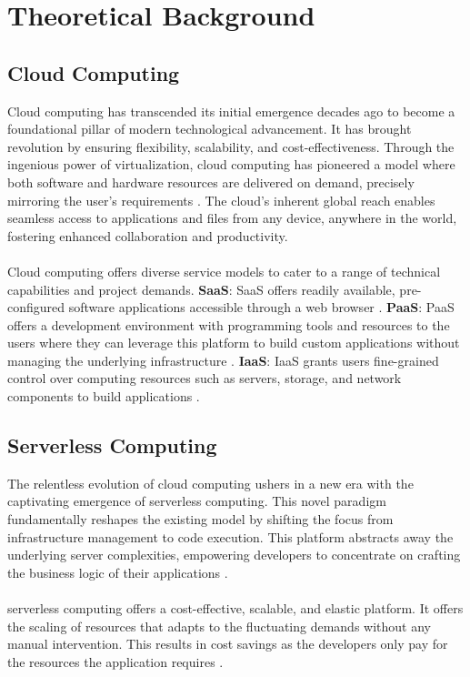 %
\section{Theoretical Background}\label{sec:theoretical background}
%
\subsection {Cloud Computing}
Cloud computing has transcended its initial emergence decades ago to become a foundational pillar of modern technological advancement. It has brought revolution by ensuring flexibility, scalability, and cost-effectiveness. Through the ingenious power of virtualization, cloud computing has pioneered a model where both software and hardware resources are delivered on demand, precisely mirroring the user's requirements \cite{Chou15}. The cloud's inherent global reach enables seamless access to applications and files from any device, anywhere in the world, fostering enhanced collaboration and productivity\cite{NIST}.\\\\
Cloud computing offers diverse service models to cater to a range of technical capabilities and project demands. 
\textbf {\ac{SaaS}}: SaaS offers readily available, pre-configured software applications accessible through a web browser \cite{Odu18,HBS21}. 
\textbf {\ac{PaaS}}: PaaS offers a development environment with programming tools and resources to the users where they can leverage this platform to build custom applications without managing the underlying infrastructure \cite{Odu18,HBS21}. 
\textbf {\ac{IaaS}}: IaaS grants users fine-grained control over computing resources such as servers, storage, and network components to build applications \cite{Odu18,HBS21}. \\

\subsection {Serverless Computing}

The relentless evolution of cloud computing ushers in a new era with the captivating emergence of serverless computing. This novel paradigm fundamentally reshapes the existing model by shifting the focus from infrastructure management to code execution. This platform abstracts away the underlying server complexities, empowering developers to concentrate on crafting the business logic of their applications \cite{Baldini17, SA20}.\\\\
serverless computing offers a cost-effective, scalable, and elastic platform. It offers the scaling of resources that adapts to the fluctuating demands without any manual intervention. This results in cost savings as the developers only pay for the resources the application requires \cite{CIM+19}.\\